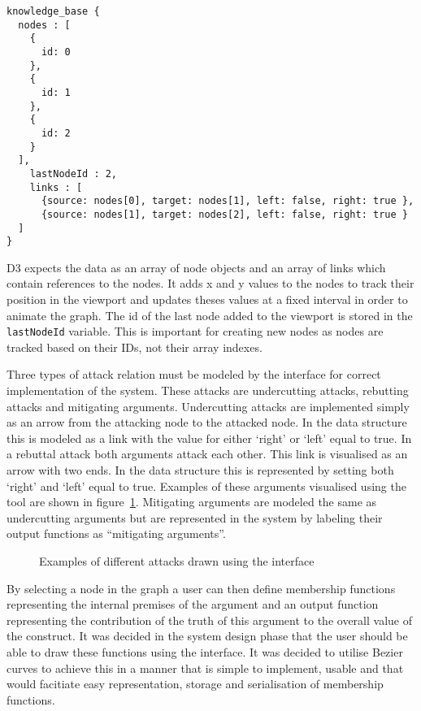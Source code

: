 \begin{lstlisting}[caption={JSON data structure for argumentation framework},label={lst:kbds}]
knowledge_base {
  nodes : [
    {
      id: 0
    },
    {
      id: 1
    },
    {
      id: 2
    }
  ],
    lastNodeId : 2,
    links : [
      {source: nodes[0], target: nodes[1], left: false, right: true },
      {source: nodes[1], target: nodes[2], left: false, right: true }
  ]
}
\end{lstlisting}

D3 expects the data as an array of node objects and an array of links which contain references to the nodes. It adds x and y values to the nodes to track their position in the viewport and updates theses values at a fixed interval in order to animate the graph. The id of the last node added to the viewport is stored in the \lstinline{lastNodeId} variable. This is important for creating new nodes as nodes are tracked based on their IDs, not their array indexes. 

Three types of attack relation must be modeled by the interface for correct implementation of the system. These attacks are undercutting attacks, rebutting attacks and mitigating arguments. Undercutting attacks are implemented simply as an arrow from the attacking node to the attacked node. In the data structure this is modeled as a link with the value for either `right' or `left' equal to true. In a rebuttal attack both arguments attack each other. This link is visualised as an arrow with two ends. In the data structure this is represented by setting both `right' and `left' equal to true. Examples of these arguments visualised using the tool are shown in figure~\ref{fig:undercutting}. Mitigating arguments are modeled the same as undercutting arguments but are represented in the system by labeling their output functions as ``mitigating arguments''.

\begin{figure}
\hfill
{}\hfill
\caption{Examples of different attacks drawn using the interface}
\label{fig:undercutting}
\end{figure}

By selecting a node in the graph a user can then define membership functions representing the internal premises of the argument and an output function representing the contribution of the truth of this argument to the overall value of the construct. It was decided in the system design phase that the user should be able to draw these functions using the interface. It was decided to utilise Bezier curves to achieve this in a manner that is simple to implement, usable and that would facitiate easy representation, storage and serialisation of membership functions. 


